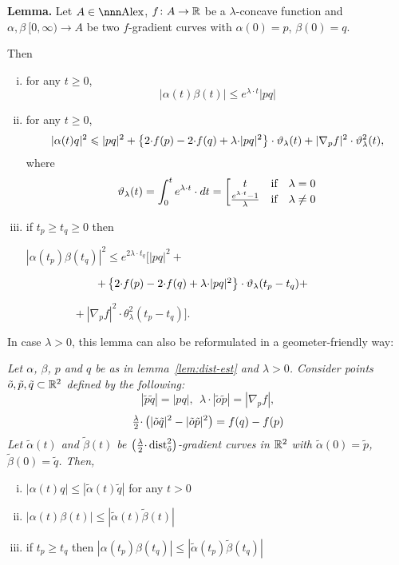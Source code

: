 \documentclass{article}
\begin{document}
\begin{thm}{\bf Lemma.} \label{lem:dist-est}
Let $A\in\Alex$, $f\colon A\to \mathbb{R}$ 
be a $\lambda$-concave function 
and
$\alpha,\beta\:[0,\infty)\to A$ be two $f$-gradient curves with $\alpha(0)=p$,
$\beta(0)=q$. 

Then 
\begin{enumerate}[(i)]
\item\label{two-equal-ends} for any $t\ge0$,
$$|\alpha(t)\beta(t)|\le e^{\lambda{\cdot}t}|p q|$$
\item \label{one-end} for any $t\ge0$,
$$|\alpha(t)q|^2\leqslant|p q|^2+ 
\left\{2{\cdot}f(p)-2{\cdot}f(q)+\lambda{\cdot}
|p q|^2\right\}\cdot\vartheta_\lambda(t)
+|\nabla_p f|^2\cdot\vartheta^2_\lambda(t),$$
where 
$$\vartheta_\lambda(t)=\int_0^t e^{\lambda{\cdot}t}\cdot d t=
\left[
\begin{matrix}
t &\text{if}&\lambda=0\\
\frac{e^{\lambda{\cdot}t}-1}\lambda&\text{if}&\lambda\not=0
\end{matrix}
\right.
$$
 
\item \label{two-ends} if $t_p\ge t_q\ge 0$ then

$|\alpha(t_p)\beta(t_q)|^2
\le e^{2\lambda{\cdot}t_q}
\bigl[|p q|^2+ 
 $

$\ \ \ \ \ \ \ \ \ \ \ \ \ \ \ \ \ \ \ +\l\{2{\cdot}f(p)-2{\cdot}f(q)+\lambda{\cdot}
|p
q|^2\r\}\cdot\theta_\lambda(t_p-t_q)+$

$\ \ \ \ \ \ \ \ \ \ \ \ \ \ \ \ \ \ \ +|\nabla_p f|^2
\cdot\theta^2_\lambda(t_p-t_q)\bigr].$
\end{enumerate}
\end{thm}

In case $\lambda>0$, this lemma can also be reformulated in a geometer-friendly way:

\bigskip

{\it 
Let $\alpha$, $\beta$, $p$ and $q$ be as in lemma~\ref{lem:dist-est} and $\lambda>0$. 
Consider points $\tilde o, \tilde p, \tilde q\subset \mathbb{R}^2$ defined by the
following:
$$|\tilde p\tilde q|=|p q|,\ \ \lambda{\cdot}
|\tilde o\tilde p|=|\nabla_p f|,$$
$$\tfrac\lambda2{\cdot}\left(|\tilde o\tilde q|^2-|\tilde o\tilde p|^2\right)=f(q)-f(p)$$
Let $\tilde\alpha(t)$ and $\tilde\beta(t)$ be 
$\left({\frac\lambda2{\cdot}\operatorname{dist}^2_{\tilde o}}\right)$-gradient curves in $\mathbb{R}^2$ with
$\tilde \alpha(0)=\tilde p$, $\tilde \beta(0)=\tilde q$.
Then,
\begin{enumerate}[(i)]
\item $|\alpha(t)q|\le |\tilde\alpha(t)\tilde q|$ for any $t>0$
\item $|\alpha(t)\beta(t)|\le|\tilde\alpha(t)\tilde\beta(t)|$
\item if $t_p\ge t_q$ then $|\alpha(t_p)\beta(t_q)|\le
|\tilde\alpha(t_p)\tilde\beta(t_q)|$
\end{enumerate}
}
\end{document}
